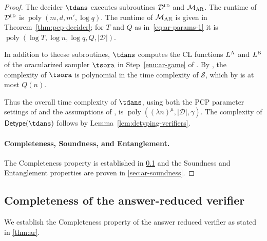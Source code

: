 \documentclass[11pt]{article}
\theoremstyle{definition}
\newcommand{\ld}{\textsc{ld}}
\DeclareMathOperator{\poly}{poly}
\newcommand{\sampler}{\mathcal{S}}
\newcommand{\decider}{\mathcal{D}}
\newcommand{\gamestyle}[1]{\ensuremath{\textsc{#1}}\xspace}
\newcommand{\ar}{\gamestyle{AR}}
\newcommand{\labelstyle}[1]{\ensuremath{\textsc{#1}}\xspace}
\newcommand{\alice}{\labelstyle{A}}
\newcommand{\bob}{\labelstyle{B}}
\newcommand{\tmstyle}[1]{\ensuremath{\mathsf{#1}}}
\newcommand{\detype}{\tmstyle{Detype}}
\newcommand{\pcpverifier}{\mathcal{M}_\ar}
\begin{document}
\begin{proof}
The decider $\tdans$ executes subroutines $\decider^\ld$ and $\pcpverifier$.
The runtime of $\decider^\ld$ is $\poly(m, d, m', \log q)$.
The runtime of $\pcpverifier$ is given in Theorem~\ref{thm:pcp-decider}; for $T$
and $Q$ as in~\eqref{eq:ar-params-1} it is $\poly(\log T,\log n,\log q, Q,
|\decider|)$.
  
In addition to theese subroutines, $\tdans$ computes the CL functions $L^\alice$
and $L^\bob$ of the oracularized sampler $\tsora$ in Step~\ref{enu:ar-game} of
.
By , the complexity of $\tsora$ is polynomial in
the time complexity of $\sampler$, which by  is at
most $Q(n)$.
  
Thus the overall time complexity of $\tdans$, using both the PCP parameter
settings of  and the assumptions of
, is $\poly( (\lambda n)^\mu, |\decider|, \gamma)$.
The complexity of $\detype(\tdans)$ follows by
Lemma~\ref{lem:detyping-verifiers}.







\paragraph{Completeness, Soundness, and Entanglement.}
The Completeness property is established in \cref{sec:ar-completeness} and the
Soundness and Entanglement properties are proven in \cref{sec:ar-soundness}.
\end{proof}

\subsection{Completeness of the answer-reduced verifier}
\label{sec:ar-completeness}

We establish the Completeness property of the answer reduced verifier as stated
in \cref{thm:ar}.
\end{document}
